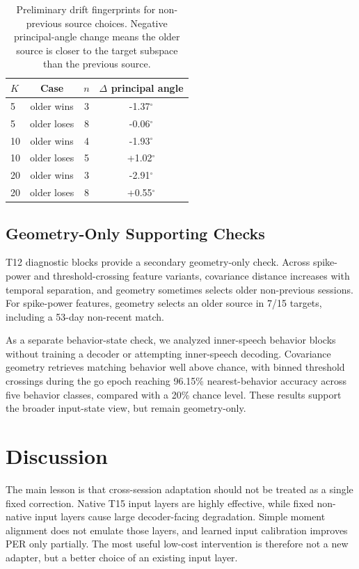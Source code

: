 \documentclass{article}
\begin{document}
\begin{table}[t]
\centering
\caption{Preliminary drift fingerprints for non-previous source choices. Negative principal-angle change means the older source is closer to the target subspace than the previous source.}
\small
\begin{tabular}{lccc}
\toprule
$K$ & Case & $n$ & $\Delta$ principal angle \\
\midrule
5 & older wins & 3 & -1.37$^\circ$ \\
5 & older loses & 8 & -0.06$^\circ$ \\
10 & older wins & 4 & -1.93$^\circ$ \\
10 & older loses & 5 & +1.02$^\circ$ \\
20 & older wins & 3 & -2.91$^\circ$ \\
20 & older loses & 8 & +0.55$^\circ$ \\
\bottomrule
\end{tabular}
\label{tab:drift-fingerprints}
\end{table}

\subsection{Geometry-Only Supporting Checks}
T12 diagnostic blocks provide a secondary geometry-only check. Across spike-power and threshold-crossing feature variants, covariance distance increases with temporal separation, and geometry sometimes selects older non-previous sessions. For spike-power features, geometry selects an older source in 7/15 targets, including a 53-day non-recent match.

As a separate behavior-state check, we analyzed inner-speech behavior blocks without training a decoder or attempting inner-speech decoding. Covariance geometry retrieves matching behavior well above chance, with binned threshold crossings during the go epoch reaching 96.15\% nearest-behavior accuracy across five behavior classes, compared with a 20\% chance level. These results support the broader input-state view, but remain geometry-only.

\section{Discussion}
The main lesson is that cross-session adaptation should not be treated as a single fixed correction. Native T15 input layers are highly effective, while fixed non-native input layers cause large decoder-facing degradation. Simple moment alignment does not emulate those layers, and learned input calibration improves PER only partially. The most useful low-cost intervention is therefore not a new adapter, but a better choice of an existing input layer.
\end{document}
